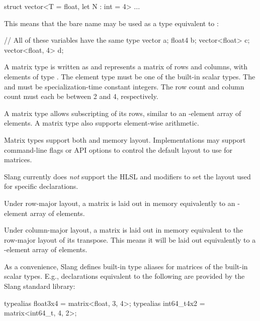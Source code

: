 \begin{codeblock}
struct vector<T = float, let N : int = 4> { ... }
\end{codeblock}

This means that the bare name  may be used as a type equivalent to :

\begin{codeblock}
// All of these variables have the same type
vector a;
float4 b;
vector<float> c;
vector<float, 4> d;
\end{codeblock}


A matrix type is written as  and represents a matrix of  rows and  columns, with elements of type .
The element type  must be one of the built-in scalar types.
The   and   must be specialization-time constant integers.
The row count and column count must each be between 2 and 4, respectively.

A matrix type allows subscripting of its rows, similar to an -element array of  elements.
A matrix type also supports element-wise arithmetic.

Matrix types support both  and  memory layout.
Implementations may support command-line flags or API options to control the default layout to use for matrices.

\begin{Note}
Slang currently does \emph{not} support the HLSL  and  modifiers to set the layout used for specific declarations.
\end{Note}

Under row-major layout, a matrix is laid out in memory equivalently to an -element array of  elements.

Under column-major layout, a matrix is laid out in memory equivalent to the row-major layout of its transpose.
This means it will be laid out equivalently to a -element array of  elements.

As a convenience, Slang defines built-in type aliases for matrices of the built-in scalar types.
E.g., declarations equivalent to the following are provided by the Slang standard library:

\begin{codeblock}
typealias float3x4 = matrix<float, 3, 4>;
typealias int64_t4x2 = matrix<int64_t, 4, 2>;
\end{codeblock}


